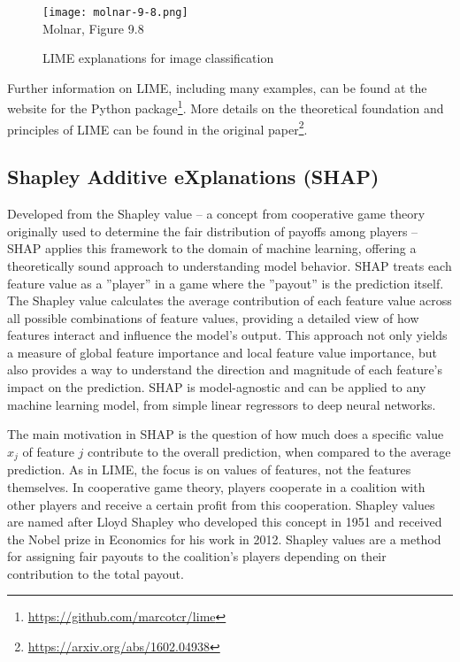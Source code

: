 \begin{figure}
\centering
\texttt{[image: molnar-9-8.png]} \\

\scriptsize Molnar, Figure 9.8
\caption{LIME explanations for image classification}
\label{fig:molnar98}
\end{figure}

\begin{tcolorbox}[colback=code]
\small
Further information on LIME, including many examples, can be found at the website for the Python package\footnote{\url{https://github.com/marcotcr/lime}}. More details on the theoretical foundation and principles of LIME can be found in the original paper\footnote{\url{https://arxiv.org/abs/1602.04938}}.
\normalsize
\end{tcolorbox}

\subsection{Shapley Additive eXplanations (SHAP)}

Developed from the Shapley value -- a concept from cooperative game theory originally used to determine the fair distribution of payoffs among players -- SHAP applies this framework to the domain of machine learning, offering a theoretically sound approach to understanding model behavior. SHAP treats each feature value as a ''player'' in a game where the ''payout'' is the prediction itself. The Shapley value calculates the average contribution of each feature value across all possible combinations of feature values, providing a detailed view of how features interact and influence the model's output. This approach not only yields a measure of global feature importance and local feature value importance, but also provides a way to understand the direction and magnitude of each feature's impact on the prediction. SHAP is model-agnostic and can be applied to any machine learning model, from simple linear regressors to deep neural networks. 

The main motivation in SHAP is the question of how much does a specific value $x_j$ of feature $j$ contribute to the overall prediction, when compared to the average prediction. As in LIME, the focus is on values of features, not the features themselves. In cooperative game theory, players cooperate in a coalition with other players and receive a certain profit from this cooperation. Shapley values are named after Lloyd Shapley who developed this concept in 1951 and received the Nobel prize in Economics for his work in 2012. Shapley values are a method for assigning fair payouts to the coalition's players depending on their contribution to the total payout. 

